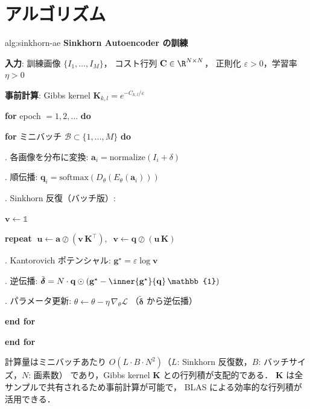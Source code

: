\section{アルゴリズム}\label{sec:ae-algorithm}

\begin{algorithm}{alg:sinkhorn-ae}
\textbf{Sinkhorn Autoencoder の訓練}

\medskip
\textbf{入力}: 訓練画像 $\{I_1, \ldots, I_M\}$，
コスト行列 $\mathbf{C} \in \R^{N \times N}$，
正則化 $\varepsilon > 0$，学習率 $\eta > 0$

\textbf{事前計算}: Gibbs kernel $\mathbf{K}_{k,l} = e^{-C_{k,l}/\varepsilon}$

\medskip
\textbf{for} epoch $= 1, 2, \ldots$ \textbf{do}

\quad \textbf{for} ミニバッチ $\mathcal{B} \subset \{1, \ldots, M\}$ \textbf{do}

. 各画像を分布に変換:
$\mathbf{a}_i = \mathrm{normalize}(I_i + \delta)$

. 順伝播:
$\mathbf{q}_i = \mathrm{softmax}(D_\theta(E_\theta(\mathbf{a}_i)))$

. Sinkhorn 反復（バッチ版）:

\qquad\quad $\mathbf{v} \leftarrow \mathbb{1}$

\qquad\quad \textbf{repeat}
$\;
\mathbf{u} \leftarrow \mathbf{a} \oslash (\mathbf{v}\, \mathbf{K}^\top),
\;\;
\mathbf{v} \leftarrow \mathbf{q} \oslash (\mathbf{u}\, \mathbf{K})
$

. Kantorovich ポテンシャル:
$\mathbf{g}^\star = \varepsilon \log \mathbf{v}$

. 逆伝播:
$\tilde{\boldsymbol{\delta}} = N \cdot \mathbf{q} \odot
(\mathbf{g}^\star - \inner{\mathbf{g}^\star}{\mathbf{q}}\, \mathbb{1})$

. パラメータ更新:
$\theta \leftarrow \theta - \eta\, \nabla_\theta \mathcal{L}$
（$\tilde{\boldsymbol{\delta}}$ から逆伝播）

\quad \textbf{end for}

\textbf{end for}
\end{algorithm}

計算量はミニバッチあたり
$O(L \cdot B \cdot N^2)$（$L$: Sinkhorn 反復数，$B$: バッチサイズ，$N$: 画素数）
であり，Gibbs kernel $\mathbf{K}$ との行列積が支配的である．
$\mathbf{K}$ は全サンプルで共有されるため事前計算が可能で，
BLAS による効率的な行列積が活用できる．
